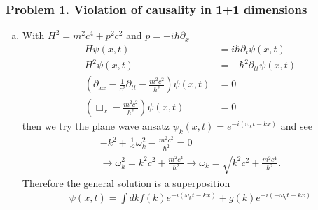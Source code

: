 \documentclass[10pt,a4paper]{book}
\theoremstyle{definition}
\begin{document}
\subsubsection{Problem 1. Violation of causality in 1+1 dimensions}
\begin{enumerate}[(a)]
\item With $H^2=m^2c^4+p^2c^2$ and $p=-i\hbar\partial_x$
\begin{align}
H\psi(x,t)&=i\hbar\partial_t\psi(x,t)\\
H^2\psi(x,t)&=-\hbar^2\partial_{tt}\psi(x,t)\\
\left(\partial_{xx}-\frac{1}{c^2}\partial_{tt}-\frac{m^2c^2}{\hbar^2}\right)\psi(x,t)&=0\\
\left(\Box_{x}-\frac{m^2c^2}{\hbar^2}\right)\psi(x,t)&=0
\end{align}
then we try the plane wave ansatz $\psi_k(x,t)=e^{-i(\omega_k t-kx)}$ and see
\begin{align}
-k^2+\frac{1}{c^2}\omega_k^2-\frac{m^2c^2}{\hbar^2}=0\\
\rightarrow\omega_k^2=k^2c^2+\frac{m^2c^4}{\hbar^2}
\rightarrow\omega_k=\sqrt{k^2c^2+\frac{m^2c^4}{\hbar^2}}.
\end{align}
Therefore the general solution is a superposition
\begin{align}
\psi(x,t)=\int dk f(k)e^{-i(\omega_k t-kx)} + g(k) e^{-i(-\omega_k t-kx)}
\end{align}



\end{enumerate}
\end{document}
